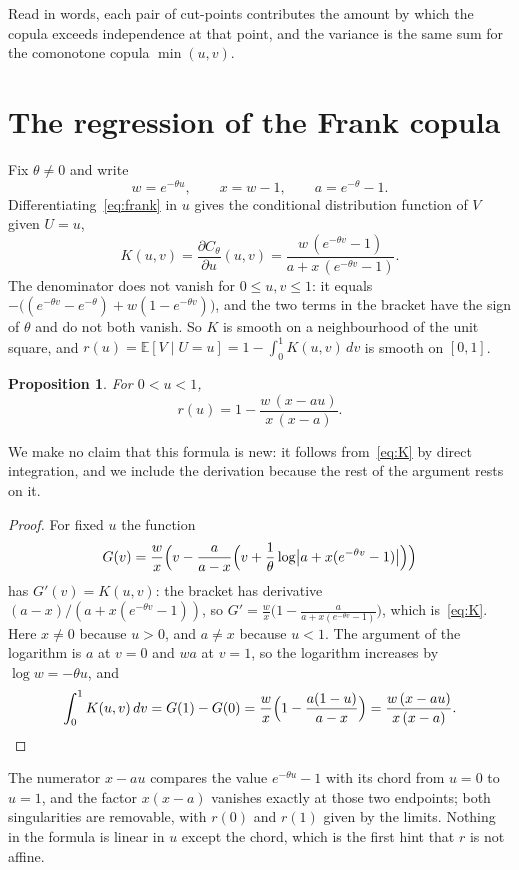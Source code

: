 \documentclass[11pt]{amsart}
\newtheorem{prop}[thm]{Proposition}
\theoremstyle{definition}
\newcommand{\E}{\mathbb{E}}
\begin{document}
Read in words, each pair of cut-points contributes the amount by which the copula exceeds independence at that
point, and the variance is the same sum for the comonotone copula $\min(u,v)$.

\section{The regression of the Frank copula}

Fix $\theta\ne0$ and write
\[
w=e^{-\theta u},\qquad x=w-1,\qquad a=e^{-\theta}-1.
\]
Differentiating~\eqref{eq:frank} in $u$ gives the conditional distribution function of $V$ given $U=u$,
\begin{equation}\label{eq:K}
K(u,v)=\frac{\partial C_\theta}{\partial u}(u,v)=\frac{w\,(e^{-\theta v}-1)}{a+x\,(e^{-\theta v}-1)}.
\end{equation}
The denominator does not vanish for $0\le u,v\le1$: it equals $-\bigl((e^{-\theta v}-e^{-\theta})+w(1-e^{-\theta v})\bigr)$,
and the two terms in the bracket have the sign of $\theta$ and do not both vanish. So $K$ is smooth on a
neighbourhood of the unit square, and $r(u)=\E[V\mid U=u]=1-\int_0^1K(u,v)\,dv$ is smooth on $[0,1]$.

\begin{prop}\label{prop:reg}
For $0<u<1$,
\[
r(u)=1-\frac{w\,(x-au)}{x\,(x-a)}.
\]
\end{prop}

We make no claim that this formula is new: it follows from~\eqref{eq:K} by direct integration, and we include the
derivation because the rest of the argument rests on it.

\begin{proof}
For fixed $u$ the function
\[
G(v)=\frac{w}{x}\Bigl(v-\frac{a}{a-x}\Bigl(v+\frac1\theta\log\bigl|a+x(e^{-\theta v}-1)\bigr|\Bigr)\Bigr)
\]
has $G'(v)=K(u,v)$: the bracket has derivative $(a-x)/(a+x(e^{-\theta v}-1))$, so
$G'=\frac wx\bigl(1-\frac{a}{a+x(e^{-\theta v}-1)}\bigr)$, which is~\eqref{eq:K}. Here $x\ne0$ because $u>0$, and
$a\ne x$ because $u<1$. The argument of the logarithm is $a$ at $v=0$ and $wa$ at $v=1$, so the logarithm increases by
$\log w=-\theta u$, and
\[
\int_0^1K(u,v)\,dv=G(1)-G(0)=\frac wx\Bigl(1-\frac{a(1-u)}{a-x}\Bigr)=\frac{w\,(x-au)}{x\,(x-a)}.\qedhere
\]
\end{proof}

The numerator $x-au$ compares the value $e^{-\theta u}-1$ with its chord from $u=0$ to $u=1$, and the factor
$x(x-a)$ vanishes exactly at those two endpoints; both singularities are removable, with $r(0)$ and $r(1)$ given by
the limits. Nothing in the formula is linear in $u$ except the chord, which is the first hint that $r$ is not affine.
\end{document}
